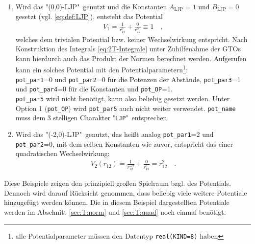\begin{enumerate}
	\item Wird das  "(0,0)-LJP"\ genutzt und die Konstanten 
	$A_\text{LJP}=1$ 
	und 
	$B_\text{LJP}=0$ gesetzt (vgl. \ref{eq:def:LJP}), entsteht das 
	Potential
	\begin{align}\label{eq:def:V1}
	V_1 = \frac{1}{r_{12}^0}+\frac{0}{r_{12}^0}\equiv 1 \quad,
	\end{align}
	welches dem trivialen Potential bzw. keiner Wechselwirkung 
	entspricht. Nach Konstruktion des Integrals \ref{eq:2T-Integrale} 
	unter 
	Zuhilfenahme der GTOs kann hierdurch auch das Produkt der Normen 
	berechnet werden. Aufgerufen 
	kann ein solches Potential mit den 
	Potentialparametern\footnote{alle 
	Potentialparameter müssen den Datentyp \texttt{real(KIND=8)} haben}:\\
	\texttt{pot\_par1}=0 und \texttt{pot\_par2}=0 für die Potenzen der 
	Abstände, 
	\texttt{pot\_par3}=1 und 
	\texttt{pot\_par4}=0 für die Konstanten und \texttt{pot\_OP}=1.\\
	\texttt{pot\_par5} wird nicht benötigt, kann also beliebig gesetzt werden. 
	Unter 
	Option 1 (\texttt{pot\_OP}) wird \texttt{pot\_par5} auch nicht weiter 
	verwendet. \texttt{pot\_name} 
	muss dem 3 
	stelligen Charakter "\texttt{LJP}"\ entsprechen.
	\item Wird das "(-2,0)-LJP"\ genutzt, das heißt analog \texttt{pot\_par1}=2 
	und 
	\texttt{pot\_par2}=0, mit dem selben Konstanten wie zuvor, entspricht das 
	einer 
	quadratischen Wechselwirkung:
	\begin{align}\label{eq:def:V2}
	V_2(r_{12})=\frac{1}{r_{12}^{-2}}+\frac{0}{r_{12}^0}=r_{12}^2\quad.
	\end{align}
\end{enumerate}
Diese Beispiele zeigen den prinzipiell großen Spielraum bzgl. des 
Potentials. 
Dennoch wird darauf Rücksicht genommen, dass beliebig viele weitere 
Potentiale 
hinzugefügt werden können. Die in diesem Beispiel dargestellten 
Potentiale 
werden im Abschnitt \ref{sec:T:norm} und \ref{sec:T:quad} noch einmal 
benötigt.\\

